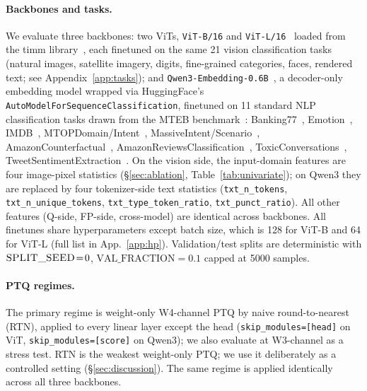 \documentclass{article}
\newcommand{\ptq}{\textsc{PTQ}\xspace}
\begin{document}
\paragraph{Backbones and tasks.}
We evaluate three backbones: two ViTs, \texttt{ViT-B/16} and \texttt{ViT-L/16}~\cite{dosovitskiy2021image} loaded from the timm library~\cite{rw2019timm}, each finetuned on the same 21 vision classification tasks (natural images, satellite imagery, digits, fine-grained categories, faces, rendered text; see Appendix~\ref{app:tasks}); and \texttt{Qwen3-Embedding-0.6B}~\cite{zhang2025qwen3}, a decoder-only embedding model wrapped via HuggingFace's \texttt{AutoModelForSequenceClassification}, finetuned on 11 standard NLP classification tasks drawn from the MTEB benchmark~\cite{muennighoff2023mteb}: Banking77~\cite{casanueva-etal-2020-efficient}, Emotion~\cite{saravia-etal-2018-carer}, IMDB~\cite{maas-etal-2011-learning}, MTOPDomain/Intent~\cite{li-etal-2021-mtop}, MassiveIntent/Scenario~\cite{fitzgerald2022massive}, AmazonCounterfactual~\cite{oneill-etal-2021-wish}, AmazonReviewsClassification~\cite{keung2020multilingual}, ToxicConversations~\cite{jigsaw-unintended-bias-in-toxicity-classification}, TweetSentimentExtraction~\cite{tweet-sentiment-extraction}. On the vision side, the input-domain features are four image-pixel statistics (\S\ref{sec:ablation}, Table~\ref{tab:univariate}); on Qwen3 they are replaced by four tokenizer-side text statistics (\texttt{txt\_n\_tokens}, \texttt{txt\_n\_unique\_tokens}, \texttt{txt\_type\_token\_ratio}, \texttt{txt\_punct\_ratio}). All other features (Q-side, FP-side, cross-model) are identical across backbones.
All finetunes share hyperparameters except batch size, which is 128 for ViT-B and 64 for ViT-L (full list in App.~\ref{app:hp}). Validation/test splits are deterministic with \(\textsc{SPLIT\_SEED}\!=\!0\), \(\text{VAL\_FRACTION}\!=\!0.1\) capped at 5000 samples.

\paragraph{\ptq{} regimes.}
The primary regime is weight-only W4-channel \ptq{} by naive round-to-nearest (RTN), applied to every linear layer except the head (\texttt{skip\_modules=[head]} on ViT, \texttt{skip\_modules=[score]} on Qwen3); we also evaluate at W3-channel as a stress test. RTN is the weakest weight-only \ptq{}; we use it deliberately as a controlled setting (\S\ref{sec:discussion}).
The same regime is applied identically across all three backbones.
\end{document}
